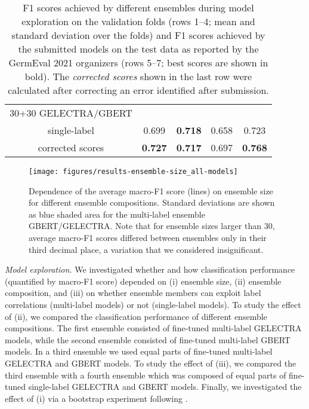 \documentclass[11pt,a4paper]{article}
\begin{document}
\begin{table*}
\begin{center}
\begin{tabular}{c|c|c|c|c}
          30+30 GELECTRA/GBERT & & & & \\
          single-label & 0.699 & \textbf{0.718} & 0.658 & 0.723 \\
          corrected scores & \textbf{0.727} & \textbf{0.717} & 0.697 & \textbf{0.768} \\
      \end{tabular}
    \end{center}
    \caption{
        F1 scores achieved by different ensembles during model exploration on the validation folds (rows 1--4; mean and standard deviation over the folds) and F1 scores achieved by the submitted models on the test data as reported by the GermEval 2021 organizers (rows 5--7; best scores are shown in bold).
        The \emph{corrected scores} shown in the last row were calculated after correcting an error identified after submission.
      }
      \label{tab:f1scores}
\end{table*}

\begin{figure}
    \texttt{[image: figures/results-ensemble-size\_all-models]}
    \caption{Dependence of the average macro-F1 score (lines) on ensemble size for different ensemble compositions. Standard deviations are shown as blue shaded area for the multi-label ensemble GBERT/GELECTRA. Note that for ensemble sizes larger than 30, average macro-F1 scores differed between ensembles only in their third decimal place, a variation that we considered insignificant.}
    \label{fig:ensemble}
\end{figure}


\emph{Model exploration.}
We investigated whether and how classification performance (quantified by macro-F1 score) depended on (i) ensemble size, (ii) ensemble composition, and (iii) on whether ensemble members can exploit label correlations (\mbox{multi-label} models) or not (single-label models). To study the effect of (ii), we compared the classification performance of different ensemble compositions. The first ensemble consisted of fine-tuned multi-label GELECTRA models, while the second ensemble consisted of fine-tuned multi-label GBERT models. In a third ensemble we used equal parts of fine-tuned multi-label GELECTRA and GBERT models. To study the effect of (iii), we compared the third ensemble with a fourth ensemble which was composed of equal parts of \mbox{fine-tuned} single-label GELECTRA and GBERT models. Finally, we investigated the effect of (i) via a bootstrap experiment following \citet{Risch2020}.
\end{document}
